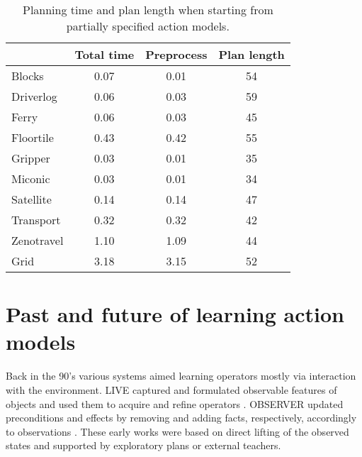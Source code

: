 \documentclass[letterpaper]{article} %
\newcommand{\strips}{\textsc{Strips}}     %
\begin{document}
\begin{table}
\begin{footnotesize}
	\begin{center}
		\begin{tabular}{l|c|c|c|}			
			 & Total time & Preprocess & Plan length  \\
			\hline
			Blocks & 0.07 & 0.01 & 54  \\
			Driverlog & 0.06 & 0.03 & 59 \\
			Ferry & 0.06 & 0.03 & 45 \\
			Floortile & 0.43 & 0.42 & 55 \\
			Gripper & 0.03 & 0.01 & 35 \\
			Miconic & 0.03 & 0.01 & 34  \\
			Satellite & 0.14 & 0.14 & 47 \\
			Transport & 0.32 & 0.32 & 42 \\
			Zenotravel & 1.10 & 1.09 & 44 \\
			Grid & 3.18 & 3.15 & 52 \\
		\end{tabular}
	\end{center}
        \end{footnotesize}
	\caption{\small Planning time and plan length when starting from partially specified action models.}
	\label{tab:time_plans_partial}	
\end{table}






\section{Past and future of learning action models}

Back in the 90's various systems aimed learning operators mostly via interaction with the environment. {\sc LIVE} captured and formulated observable features of objects and used them to acquire and refine operators \cite{ShenS89}. {\sc OBSERVER} updated preconditions and effects by removing and adding facts, respectively, accordingly to observations \cite{Wang95learningby}. These early works were based on direct lifting of the observed states and supported by exploratory plans or external teachers.%

\end{document}
